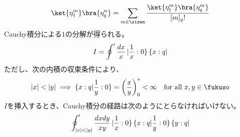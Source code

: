 {\begin{itemize}
\begin{equation*}
\begin{split}
				\ket{\eta_\dag^m}\bra{\eta_q^n}
			= \sum_{m\in\sizen} \frac{\ket{\eta_\dag^m}\bra{\eta_q^m}}{[m]_q!}
		\end{split}\end{equation*}
		Cauchy積分による$1$の分解が得られる。
		\begin{equation*}\begin{split}
			I = \oint'\frac{dx}{x}\mathinner{|{\frac{1}{x}:0}\}}\mathinner{\{{x:q}|}
		\end{split}\end{equation*}
		ただし、次の内積の収束条件により、
		\begin{equation*}\begin{split}
			|x|<|y| \implies
			\cbraket{x:q|\frac{1}{y}:0} = \lr{\frac{x}{y}}_0^* < \infty
			\quad\text{for all } x,y\in\fukuso
		\end{split}\end{equation*}
		$I$を挿入するとき、Cauchy積分の経路は次のようにとらなければいけない。
		\begin{equation*}\begin{split}
			\oint'_{|x|<|y|}\frac{dxdy}{xy}
			\cket{\frac{1}{x}:0}\cbraket{x:q|\frac{1}{y}:0}\cbra{y:q}
		\end{split}\end{equation*}
	\end{itemize} %

}
